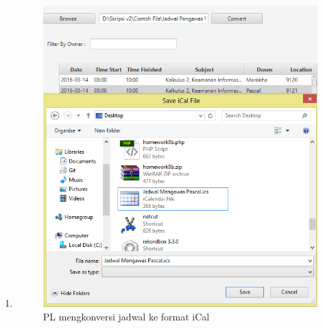 \begin{enumerate}
\begin{figure}[H]
		\label{fig:jadwalKeLayar}
		\end{figure}
	\item 
		\begin{figure}[H]
		\centering
		\includegraphics[scale=0.6]{Gambar/konversiiCal}
		\caption{PL mengkonversi jadwal ke format iCal}
		\label{fig:konversiiCal}
		\end{figure}
		

\end{enumerate}
